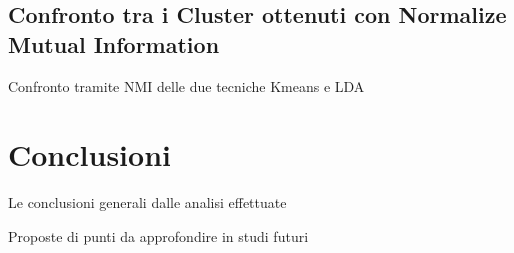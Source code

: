 \documentclass[
12pt, %
a4paper, %
oneside, %
headinclude,footinclude, %
BCOR5mm, %
]{scrartcl}
\begin{document}
	\subsection{Confronto tra i Cluster ottenuti con Normalize Mutual Information}

		Confronto tramite NMI delle due tecniche Kmeans e LDA


\section{Conclusioni}

	Le conclusioni generali dalle analisi effettuate

	Proposte di punti da approfondire in studi futuri





\renewcommand{\refname}{\spacedlowsmallcaps{References}} %




\end{document}
